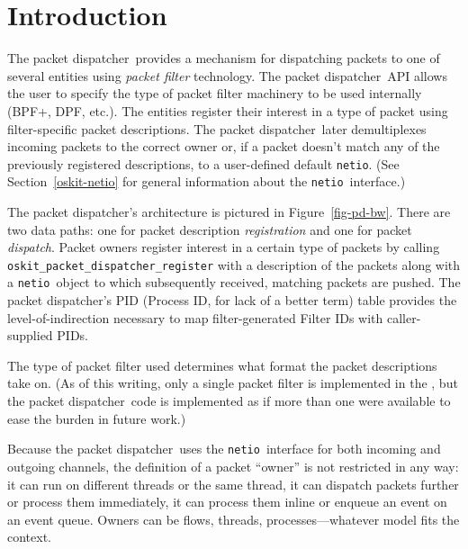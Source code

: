 %
% 
%

\def\pd{packet dispatcher}
\def\netio{\texttt{netio}}

\label{pd}

\section{Introduction}

The \pd\ provides a mechanism for dispatching
packets to one of several entities using \emph{packet filter}
technology. The \pd\ API allows the
user to specify the type of packet filter machinery to be used 
internally (BPF+, DPF, etc.). 
The entities register their interest in a type of packet using 
filter-specific packet descriptions. 
The \pd\ later demultiplexes incoming packets to the correct owner or,
if a packet doesn't match any of the previously registered
descriptions, to a user-defined default \netio. (See
Section~\ref{oskit-netio} for general information about the \netio\
interface.)

The \pd's architecture is pictured in Figure~\ref{fig-pd-bw}.
There are two data paths: one for packet description
\emph{registration} and one for packet \emph{dispatch}. Packet
owners register interest in a certain type of packets
by calling {\tt oskit_packet_dispatcher_register} with
a description of the packets along with
a \netio\ object to which subsequently received,
matching packets are pushed. The \pd's PID (Process ID,
for lack of a better term) table
provides the level-of-indirection necessary to map 
filter-generated Filter IDs with caller-supplied PIDs.

The type of packet filter used determines what format the packet
descriptions take on. (As of this writing, only a single packet filter
is implemented in the \oskit{}, but
 the \pd\ code is implemented as if
more than one were available to ease the burden in future work.)

Because the \pd\ uses the \oskit{} \netio\ interface
for both incoming and outgoing channels, the definition
of a packet ``owner'' is not restricted in any way: it can run
on different threads or the same thread, it can dispatch
packets further or process them immediately, it can 
process them inline or enqueue an event on an event queue.
Owners can be flows, threads, processes---whatever 
model fits the context. 

